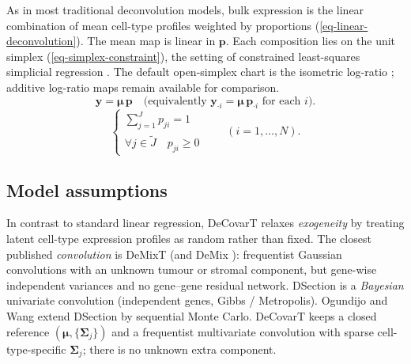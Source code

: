 \documentclass[pdflatex, sn-nature]{sn-jnl}
\theoremstyle{thmstyleone}%
\theoremstyle{thmstyletwo}%
\theoremstyle{thmstylethree}%
\begin{document}
    As in most traditional deconvolution models, bulk expression is the linear
    combination of mean cell-type profiles weighted by proportions
    (\ref{eq-linear-deconvolution}). The mean map is linear in
    $\boldsymbol{p}$. Each composition lies on the unit simplex
    (\ref{eq-simplex-constraint}), the setting of constrained
    least-squares simplicial regression
    \cite{tsagrisConstrainedLeastSquares2025}. The default open-simplex
    chart is the isometric log-ratio
    \cite{egozcueIsometricLogratioTransformations2003}; additive log-ratio
    maps remain available for comparison.
    \begin{equation}
        \label{eq-linear-deconvolution}
        \boldsymbol{y}=\boldsymbol{\mu}\,\boldsymbol{p}
        \quad\text{(equivalently }
        \boldsymbol{y}_{\cdot i}=\boldsymbol{\mu}\,\boldsymbol{p}_{\cdot i}
        \text{ for each }i\text{)}.
    \end{equation}
    \begin{equation}
        \label{eq-simplex-constraint}
        \begin{cases}
            \sum_{j=1}^{J} p_{ji}=1                      \\
            \forall j \in \widetilde{J}\quad p_{ji}\ge 0
        \end{cases}
        \qquad (i=1,\ldots,N).
    \end{equation}

    \subsection{Model assumptions}
    \label{subsec:model-assumptions-rank}

    In contrast to standard linear regression, DeCovarT relaxes
    \emph{exogeneity} by treating latent cell-type expression profiles as
    random rather than fixed. The closest published \emph{convolution} is
    DeMixT \cite{wangTranscriptomeDeconvolutionHeterogeneous2018} (and
    DeMix \cite{ahnDeMixDeconvolutionMixed2013}): frequentist Gaussian
    convolutions with an unknown tumour or stromal component, but
    gene-wise independent variances and no gene--gene residual network.
    DSection \cite{erkkilaProbabilisticAnalysisGene2010} is a
    \emph{Bayesian} univariate convolution (independent genes, Gibbs /
    Metropolis). Ogundijo and Wang
    \cite{ogundijoSequentialMonteCarlo2017} extend DSection by sequential
    Monte Carlo. DeCovarT keeps a closed reference
    $(\boldsymbol{\mu},\{\boldsymbol{\Sigma}_{j}\})$ and a frequentist
    multivariate convolution with sparse cell-type-specific
    $\boldsymbol{\Sigma}_{j}$; there is no unknown extra component.
\end{document}
